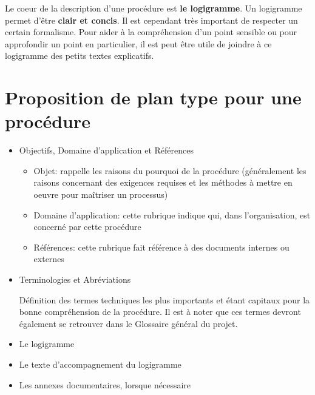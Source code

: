 \documentclass[a4paper]{article}
\begin{document}
Le coeur de la description d'une procédure est \textbf{le logigramme}. Un logigramme permet d'être \textbf{clair et concis}. Il est cependant très important de respecter un certain formalisme. Pour aider à la compréhension d'un point sensible ou pour approfondir un point en particulier, il est peut être utile de joindre à ce logigramme des petits textes explicatifs.


\section{Proposition de plan type pour une procédure}

\begin{itemize}
\item Objectifs, Domaine d'application et Références

\begin{itemize}
\item Objet: rappelle les raisons du pourquoi de la procédure (généralement les raisons concernant des exigences requises et les méthodes à mettre en oeuvre pour maîtriser un processus)
\item Domaine d'application: cette rubrique indique qui, dans l'organisation, est concerné par cette procédure
\item Références: cette rubrique fait référence à des documents internes ou externes
\end{itemize}

\item Terminologies et Abréviations

Définition des termes techniques les plus importants et étant capitaux pour la bonne compréhension de la procédure. Il est à noter que ces termes devront également se retrouver dans le Glossaire général du projet.

\item Le logigramme
\item Le texte d'accompagnement du logigramme
\item Les annexes documentaires, lorsque nécessaire
\end{itemize}

\end{document}
